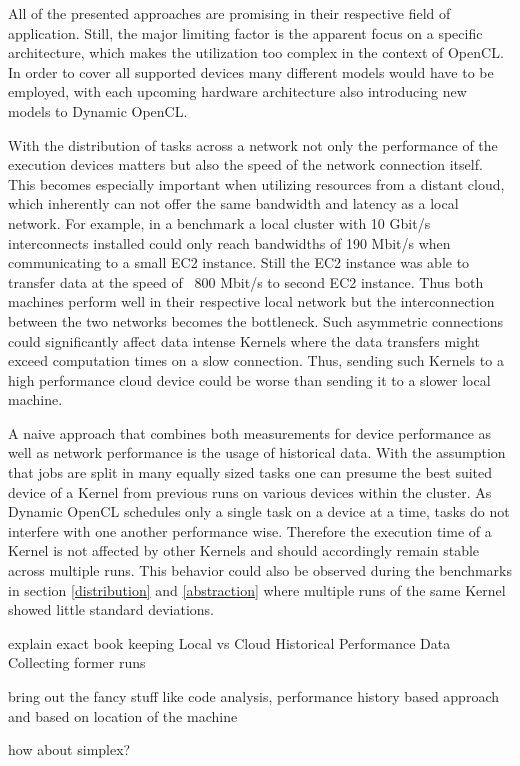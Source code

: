 All of the presented approaches are promising in their respective field of application. Still, the major limiting factor is the apparent focus on a specific architecture, which makes the utilization too complex in the context of OpenCL. In order to cover all supported devices many different models would have to be employed, with each upcoming hardware architecture also introducing new models to Dynamic OpenCL.

With the distribution of tasks across a network not only the performance of the execution devices matters but also the speed of the network connection itself. This becomes especially important when utilizing resources from a distant cloud, which inherently can not offer the same bandwidth and latency as a local network. For example, in a benchmark a local cluster with 10 Gbit/s interconnects installed could only reach bandwidths of 190 Mbit/s when communicating to a small EC2 instance. Still the EC2 instance was able to transfer data at the speed of ~800 Mbit/s to second EC2 instance. Thus both machines perform well in their respective local network but the interconnection between the two networks becomes the bottleneck. Such asymmetric connections could significantly affect data intense Kernels where the data transfers might exceed computation times on a slow connection. Thus, sending such Kernels to a high performance cloud device could be worse than sending it to a slower local machine.

A naive approach that combines both measurements for device performance as well as network performance is the usage of historical data. With the assumption that jobs are split in many equally sized tasks one can presume the best suited device of a Kernel from previous runs on various devices within the cluster. As Dynamic OpenCL schedules only a single task on a device at a time, tasks do not interfere with one another performance wise. Therefore the execution time of a Kernel is not affected by other Kernels and should accordingly remain stable across multiple runs. This behavior could also be observed during the benchmarks in section \ref{distribution} and \ref{abstraction} where multiple runs of the same Kernel showed little standard deviations.


explain exact book keeping
Local vs Cloud
Historical Performance Data
Collecting former runs

bring out the fancy stuff like code analysis, performance history based approach and based on location of the machine

how about simplex?

